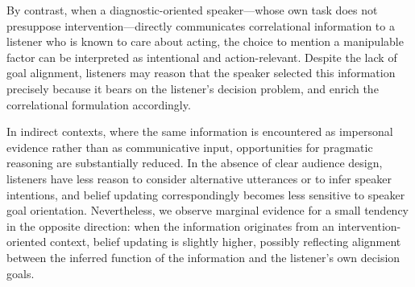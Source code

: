 \documentclass[10pt,letterpaper]{article}
\begin{document}
By contrast, when a diagnostic-oriented speaker—whose own task does not presuppose intervention—directly communicates correlational information to a listener who is known to care about acting, the choice to mention a manipulable factor can be interpreted as intentional and action-relevant. Despite the lack of goal alignment, listeners may reason that the speaker selected this information precisely because it bears on the listener’s decision problem, and enrich the correlational formulation accordingly.

In indirect contexts, where the same information is encountered as impersonal evidence rather than as communicative input, opportunities for pragmatic reasoning are substantially reduced. In the absence of clear audience design, listeners have less reason to consider alternative utterances or to infer speaker intentions, and belief updating correspondingly becomes less sensitive to speaker goal orientation. Nevertheless, we observe marginal evidence for a small tendency in the opposite direction: when the information originates from an intervention-oriented context, belief updating is slightly higher, possibly reflecting alignment between the inferred function of the information and the listener’s own decision goals.
\end{document}
